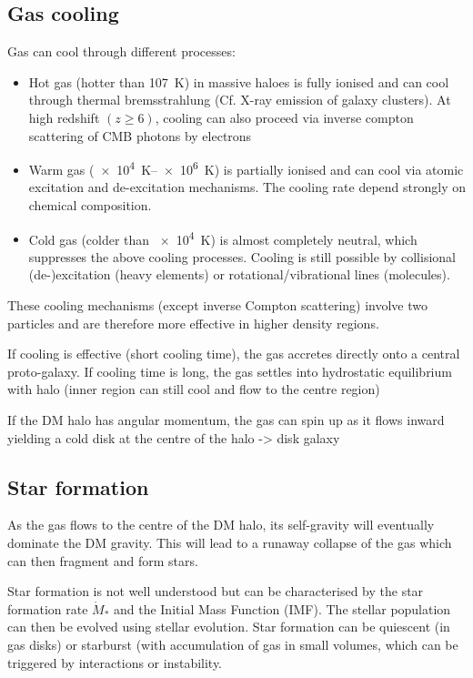 \subsection{Gas cooling}
Gas can cool through different processes:
\begin{itemize}
	\item  Hot gas (hotter than \SI{107}{\kelvin}) in massive haloes is fully ionised and can cool through thermal bremsstrahlung (Cf. X-ray emission of galaxy clusters).
	At high redshift $(z 
	\geq 6)$, cooling can also proceed via inverse compton scattering of CMB photons by electrons
	\item Warm gas (\SIrange{e4}{e6}{\kelvin}) is partially ionised and can cool via atomic excitation and de-excitation mechanisms.
	The cooling rate depend strongly on chemical composition.
	\item Cold gas (colder than \SI{e4}{\kelvin}) is almost completely neutral, which suppresses the above cooling processes.
	Cooling is still possible by collisional (de-)excitation (heavy elements) or rotational/vibrational lines (molecules).
\end{itemize}

These cooling mechanisms (except inverse Compton scattering) involve two particles and are therefore more effective in higher density regions.

If cooling is effective (short cooling time), the gas accretes directly onto a central proto-galaxy.
If cooling time is long, the gas settles into hydrostatic equilibrium with halo (inner region can still cool and flow to the centre region)

If the DM halo has angular momentum, the gas can spin up as it flows inward yielding a cold disk at the centre of the halo -> disk galaxy


\subsection{Star formation}

As the gas flows to the centre of the DM halo, its self-gravity will eventually dominate the DM gravity.
This will lead to a runaway collapse of the gas which can then fragment and form stars.

Star formation is not well understood but can be characterised by the star formation rate $\dot{M}_{*}$ and the Initial Mass Function (IMF).
The stellar population can then be evolved using stellar evolution.
Star formation can be quiescent (in gas disks) or starburst (with accumulation of gas in small volumes, which can be triggered by interactions or instability.


